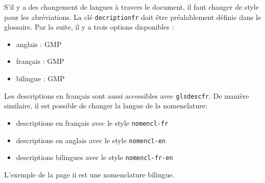 \documentclass[PhD,nohyperref,english,french]{ulthese}
\begin{document}
S'il y a des changement de langues à travers le document, il faut changer de style pour les abréviations. La clé \texttt{decriptionfr} doit être préalablement définie dans le glossaire. Par la suite, il y a trois options disponibles : 
\begin{itemize}
 \item anglais : \acrfull{GMP}
  \item français : \acrfull{GMP}
 \item bilingue : \acrfull{GMP}
\end{itemize}
Les descriptions en français sont aussi accessibles avec \texttt{glsdescfr}. De manière similaire, il est possible de changer la langue de la nomenclature:
\begin{itemize}
\item descriptions en français avec le style \texttt{nomencl-fr}
\item descriptions en anglais avec le style \texttt{nomencl-en}
\item descriptions bilingues avec le style \texttt{nomencl-fr-en}
\end{itemize}
L'exemple de la page ii est une nomenclature bilingue.
\end{document}
